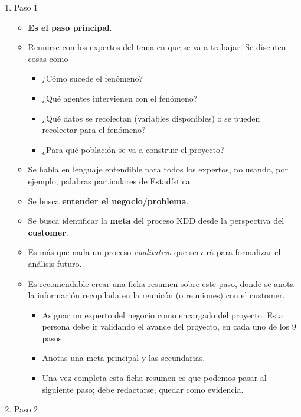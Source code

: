 \documentclass[
]{book}
\providecommand{\tightlist}{%
  \setlength{\itemsep}{0pt}\setlength{\parskip}{0pt}}
\begin{document}
\begin{enumerate}
\def\labelenumi{\arabic{enumi}.}
\tightlist
\item
  Paso 1

  \begin{itemize}
  \tightlist
  \item
    \textbf{Es el paso principal}.
  \item
    Reunirse con los expertos del tema
    en que se va a trabajar.
    Se discuten cosas como

    \begin{itemize}
    \tightlist
    \item
      ¿Cómo sucede el fenómeno?
    \item
      ¿Qué agentes intervienen con el fenómeno?
    \item
      ¿Qué datos se recolectan
      (variables disponibles) o se pueden recolectar
      para el fenómeno?
    \item
      ¿Para qué población se va a construir
      el proyecto?
    \end{itemize}
  \item
    Se habla en lenguaje entendible
    para todos los expertos, no usando, por
    ejemplo, palabras particulares de Estadística.
  \item
    Se busca \textbf{entender el negocio/problema}.
  \item
    Se busca identificar la \textbf{meta} del proceso
    KDD desde la perspectiva del \textbf{customer}.
  \item
    Es más que nada un proceso \emph{cualitativo}
    que servirá para formalizar el análisis futuro.
  \item
    Es recomendable crear una ficha resumen sobre
    este paso, donde se anota la información
    recopilada en la reunicón (o reuniones) con
    el customer.

    \begin{itemize}
    \tightlist
    \item
      Asignar un experto del negocio como
      encargado del proyecto. Esta persona debe
      ir validando el avance del proyecto, en
      cada uno de los 9 pasos.
    \item
      Anotas una meta principal y las secundarias.
    \item
      Una vez completa esta ficha resumen es
      que podemos pasar al siguiente paso; debe
      redactarse, quedar como evidencia.
    \end{itemize}
  \end{itemize}
\item
  Paso 2


\end{enumerate}
\end{document}
